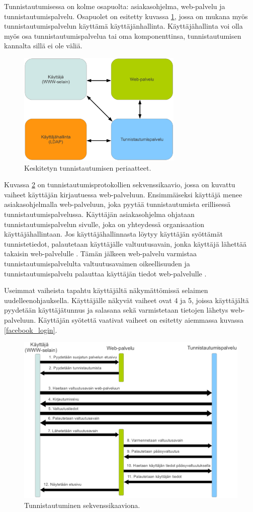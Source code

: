Tunnistautumisessa on kolme osapuolta: asiakasohjelma, web-palvelu ja tunnistautumispalvelu. Osapuolet on esitetty kuvassa \ref{composition}, jossa on mukana myös tunnistautumispalvelun käyttämä käyttäjänhallinta. Käyttäjähallinta voi olla myös osa tunnistautumispalvelua tai oma komponenttinsa, tunnistautumisen kannalta sillä ei ole väliä.

\begin{figure}[ht]
\centering
\includegraphics[width=0.7\textwidth]{teknologiat/composition.eps}
\caption{Keskitetyn tunnistautumisen periaatteet.}%
\label{composition}
\end{figure}

Kuvassa \ref{oauth} on tunnistautumisprotokollien sekvenssikaavio, jossa on kuvattu vaiheet käyttäjän kirjautuessa web-palveluun. Ensimmäiseksi käyttäjä menee asiakasohjelmalla web-palveluun, joka pyytää tunnistautumista erillisessä tunnistautumispalvelussa. Käyttäjän asiakasohjelma ohjataan tunnistautumispalvelun sivulle, joka on yhteydessä organisaation käyttäjähallintaan. Jos käyttäjähallinnasta löytyy käyttäjän syöttämät tunnistetiedot, palautetaan käyttäjälle valtuutusavain, jonka käyttäjä lähettää takaisin web-palvelulle \cite{nisti}. Tämän jälkeen web-palvelu varmistaa tunnistautumispalvelulta valtuutusavaimen oikeellisuuden ja tunnistautumispalvelu palauttaa käyttäjän tiedot web-palvelulle \cite{nisti}.

Useimmat vaiheista tapahtu käyttäjältä näkymättömissä selaimen uudelleenohjauksella. Käyttäjälle näkyvät vaiheet ovat 4 ja 5, joissa käyttäjältä pyydetään käyttäjätunnus ja salasana sekä varmistetaan tietojen lähetys web-palveluun. Käyttäjän syötettä vaativat vaiheet on esitetty aiemmassa kuvassa \ref{facebook_login}.

\begin{figure}[ht]
\centering
\includegraphics[width=\textwidth]{teknologiat/protokollat/oauth.eps}
\caption{Tunnistautuminen sekvenssikaaviona.}%
\label{oauth}
\end{figure}